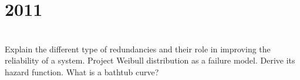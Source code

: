 \section*{2011}
\vspace{-.5cm}
\hrulefill \smallskip\\
 Explain the different type of redundancies and their role in improving the reliability of a system.
\myline
{} Project Weibull distribution as a failure model. Derive its hazard function. What is a bathtub curve?